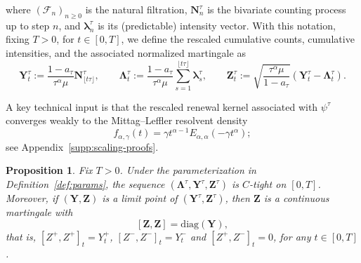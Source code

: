 \documentclass[letterpaper]{article}
\numberwithin{equation}{section}
\newtheorem{proposition}[theorem]{Proposition}
\theoremstyle{definition}
\theoremstyle{remark}
\begin{document}
where $(\mathcal F_n)_{n\ge0}$ is the natural filtration, 
$\mathbf N_n^{\tau}$ is the bivariate counting process up to step $n$, and 
$\boldsymbol\lambda_n^{\tau}$ is its (predictable) intensity vector. 
With this notation, fixing $T>0$, for $t\in[0,T]$, we define the rescaled cumulative counts, cumulative intensities, 
and the associated normalized martingale as
\[
    \mathbf Y_t^{\tau}
    :=\frac{1-a_{\tau}}{\tau^\alpha \mu}\mathbf N_{\lfloor t\tau \rfloor}^{\tau},\qquad
    \boldsymbol\Lambda_t^{\tau}
    :=\frac{1-a_{\tau}}{\tau^\alpha \mu}\sum_{s=1}^{\lfloor t\tau \rfloor}\boldsymbol\lambda_s^{\tau},\qquad 
    \mathbf Z_t^{\tau}
    :=\sqrt{\frac{\tau^\alpha\mu}{1-a_{\tau}}}\left(\mathbf Y_t^{\tau}-\boldsymbol\Lambda_t^{\tau}\right).
\]

A key technical input is that the rescaled renewal kernel associated with $\psi^\tau$ converges weakly to the Mittag--Leffler resolvent density
\[
  f_{\alpha,\gamma}(t)=\gamma t^{\alpha-1}E_{\alpha,\alpha}(-\gamma t^\alpha);
\]
see Appendix~\ref{supp:scaling-proofs}.

\begin{proposition}\label{proposition1}
  Fix $T>0$. Under the parameterization in Definition~\ref{def:params}, the sequence
  $(\boldsymbol\Lambda^{\tau},\mathbf Y^{\tau},\mathbf Z^{\tau})$ is $C$-tight on $[0,T]$.
  Moreover, if $(\mathbf Y,\mathbf Z)$ is a limit point of
  $(\mathbf Y^{\tau},\mathbf Z^{\tau})$, then $\mathbf Z$ is a continuous martingale with
  \[
    [\mathbf Z,\mathbf Z]=\mathrm{diag}(\mathbf Y),
  \]
  that is,
$[Z^+,Z^+]_t=Y_t^+$,
$[Z^-,Z^-]_t=Y_t^-$
and $[Z^+,Z^-]_t=0$, for any $t\in[0,T]$.
\end{proposition}
\end{document}
